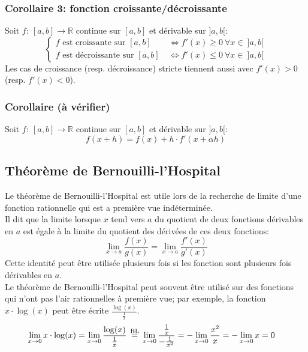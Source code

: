 \documentclass{article}
\newcommand\eqbl{\; \stackrel{ \mathclap{ \normalfont\text{BL} } }{ = } \;} %
\begin{document}
\subsubsection{Corollaire 3: fonction croissante/décroissante}
Soit \(f : \ [a, b] \to \mathbb{R}\) continue sur \([a, b]\) et dérivable sur \(]a, b[\):
\begin{equation*}
	\begin{cases}
		f \text{ est croissante sur } [a, b] \ &\Leftrightarrow f'(x) \geq 0 \ \forall x \in \ ]a, b[ \\
		f \text{ est décroissante sur } [a, b] \ &\Leftrightarrow f'(x) \leq 0 \ \forall x \in \ ]a, b[
	\end{cases}
\end{equation*}
Les cas de croissance (resp. décroissance) stricte tiennent aussi avec \(f'(x) > 0\) (resp. \(f'(x) < 0\)).

\subsubsection{Corollaire (à vérifier)}
Soit \(f : \ [a, b] \to \mathbb{R}\) continue sur \([a, b]\) et dérivable sur \(]a, b[\):
\begin{equation*}
	f(x + h) = f(x) + h \cdot f'(x + \alpha h)
\end{equation*} %

\subsection{Théorème de Bernouilli-l'Hospital}
Le théorème de Bernouilli-l'Hospital est utile lors de la recherche de limite d'une fonction rationnelle qui est a première vue indéterminée. \\

Il dit que la limite lorsque \(x\) tend vers \(a\) du quotient de deux fonctions dérivables en \(a\) est égale à la limite du quotient des dérivées de ces deux fonctions:
\begin{equation*}
	\lim_{x \to a} \dfrac{f(x)}{g(x)} = \lim_{x \to a} \dfrac{f'(x)}{g'(x)}
\end{equation*}
Cette identité peut être utilisée plusieurs fois si les fonction sont plusieurs fois dérivables en \(a\). \\

Le théorème de Bernouilli-l'Hospital peut souvent être utilisé sur des fonctions qui n'ont pas l'air rationnelles à première vue; par exemple, la fonction \(x \cdot \log(x)\) peut être écrite \(\frac{\log(x)}{\frac{1}{x}}\).
\begin{align*}
	\lim_{x \to 0} x \cdot \log(x) &= \lim_{x \to 0} \frac{\log(x)}{\frac{1}{x}} 
	\eqbl \lim_{x \to 0} \frac{\frac{1}{x}}{- \frac{1}{x^2}} 
	= - \lim_{x \to 0} \frac{x^2}{x} 
	= - \lim_{x \to 0} x = 0
\end{align*}
\end{document}
